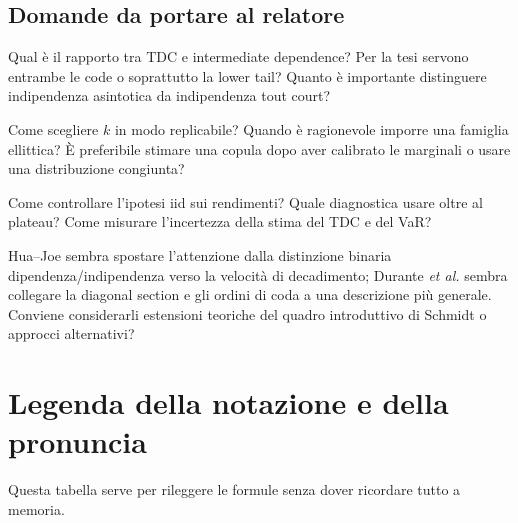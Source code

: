 \documentclass[11pt,a4paper]{article}
\begin{document}
\subsection*{Domande da portare al relatore}
\begin{description}[leftmargin=3.1cm,style=nextline]
  \item[Concettuali] Qual è il rapporto tra TDC e intermediate dependence?
  Per la tesi servono entrambe le code o soprattutto la lower tail? Quanto è
  importante distinguere indipendenza asintotica da indipendenza tout court?
  \item[Metodologiche] Come scegliere $k$ in modo replicabile? Quando è
  ragionevole imporre una famiglia ellittica? È preferibile stimare una copula
  dopo aver calibrato le marginali o usare una distribuzione congiunta?
  \item[Empiriche] Come controllare l'ipotesi iid sui rendimenti? Quale
  diagnostica usare oltre al plateau? Come misurare l'incertezza della stima
  del TDC e del VaR?
  \item[Collegamenti] Hua--Joe sembra spostare l'attenzione dalla distinzione
  binaria dipendenza/\allowbreak indipendenza verso la velocità di decadimento;
  Durante
  \emph{et al.} sembra collegare la diagonal section e gli ordini di coda a
  una descrizione più generale. Conviene considerarli estensioni teoriche del
  quadro introduttivo di Schmidt o approcci alternativi?
\end{description}

\section{Legenda della notazione e della pronuncia}
\label{sec:legenda}

Questa tabella serve per rileggere le formule senza dover ricordare tutto a
memoria.
\end{document}
